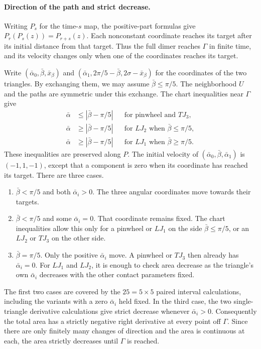 \paragraph{Direction of the path and strict decrease.}
Writing $P_s$ for the time-$s$ map, the positive-part formulas give
$P_r(P_s(z))=P_{r+s}(z)$. Each nonconstant coordinate reaches its
target after its initial distance from that target. Thus the full
dimer reaches $\Gamma$ in finite time, and its velocity changes only
when one of the coordinates reaches its target.

Write $(\bar\alpha_0,\bar\beta,\bar x_\beta)$ and
$(\bar\alpha_1,2\pi/5-\bar\beta,2\sigma-\bar x_\beta)$ for the
coordinates of the two triangles. By exchanging them, we may assume
$\bar\beta\le\pi/5$. The neighborhood $U$ and the paths are symmetric
under this exchange. The chart inequalities near $\Gamma$ give
\[
\begin{aligned}
\bar\alpha&\le|\bar\beta-\pi/5|
 &&\text{for pinwheel and $TJ_3$},\\
\bar\alpha&\ge|\bar\beta-\pi/5|
 &&\text{for $LJ_2$ when $\bar\beta\le\pi/5$},\\
\bar\alpha&\ge|\bar\beta-\pi/5|
 &&\text{for $LJ_1$ when $\bar\beta\ge\pi/5$}.
\end{aligned}
\]
These inequalities are preserved along $P$. The initial velocity of
$(\bar\alpha_0,\bar\beta,\bar\alpha_1)$ is $(-1,1,-1)$, except
that a component is zero when its coordinate has reached its target.
There are three cases.
\begin{enumerate}
\item $\bar\beta<\pi/5$ and both $\bar\alpha_i>0$. The three
  angular coordinates move towards their targets.
\item $\bar\beta<\pi/5$ and some $\bar\alpha_i=0$. That coordinate
  remains fixed. The chart inequalities allow this only for a
  pinwheel or $LJ_1$ on the side $\bar\beta\le\pi/5$, or an
  $LJ_2$ or $TJ_3$ on the other side.
\item $\bar\beta=\pi/5$. Only the positive $\bar\alpha_i$ move.
  A pinwheel or $TJ_3$ then already has $\bar\alpha_i=0$.
  For $LJ_1$ and $LJ_2$, it is enough to check area decrease as
  the triangle's own $\bar\alpha_i$ decreases with the other
  contact parameters fixed.
\end{enumerate}
The first two cases are covered by the $25=5\times5$ paired
interval calculations, including the variants with a zero
$\bar\alpha_i$ held fixed. In the third case, the two
single-triangle derivative calculations give strict decrease
whenever $\bar\alpha_i>0$. Consequently the total area has a
strictly negative right derivative at every point off $\Gamma$.
Since there are only finitely many changes of direction and the
area is continuous at each, the area strictly decreases until
$\Gamma$ is reached.


